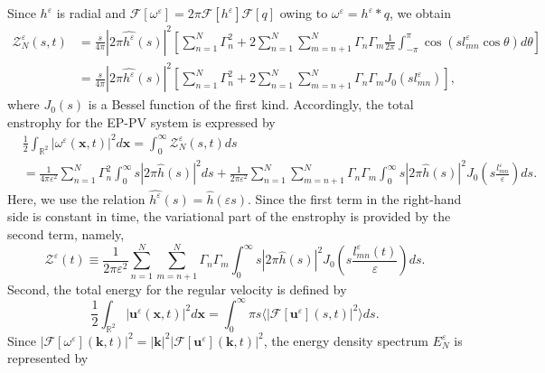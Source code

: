 \documentclass{article}
\theoremstyle{definition}
\begin{document}
Since $h^\varepsilon$ is radial and $\mathscr{F}[\omega^\varepsilon] = 2 \pi \mathscr{F}[h^\varepsilon] \mathscr{F}[q]$ owing to $\omega^\varepsilon = h^\varepsilon \ast q$, we obtain
\begin{align*}
\mathscr{Z}_N^\varepsilon (s,t) &= \frac{s}{4 \pi} \left\vert 2 \pi \widehat{h^\varepsilon}(s) \right\vert^2 \left[ \sum_{n=1}^N \Gamma_n^2 + 2 \sum_{n=1}^N \sum_{m=n+1}^N \Gamma_n \Gamma_m \frac{1}{2\pi}\int_{-\pi}^\pi \cos \left( s l_{mn}^\varepsilon \cos \theta \right) d\theta \right]  \\
& = \frac{s}{4 \pi} \left\vert 2 \pi \widehat{h^\varepsilon}(s) \right\vert^2 \left[ \sum_{n=1}^N \Gamma_n^2 + 2 \sum_{n=1}^N \sum_{m=n+1}^N \Gamma_n \Gamma_m J_0 \left( s l_{mn}^\varepsilon \right) \right],
\end{align*}
where $J_0(s)$ is a Bessel function of the first kind. Accordingly, the total enstrophy for the EP-PV system is expressed by
\begin{align*}
&\frac{1}{2}\int_{\mathbb{R}^2} \left\vert \omega^\varepsilon({\bm x}, t) \right\vert^2 d{\bm x} = \int_0^\infty  \mathscr{Z}_N^\varepsilon (s,t)  ds  \\
&= \frac{1}{4 \pi \varepsilon^2} \sum_{n=1}^N \Gamma_n^2 \int_0^\infty s \left\vert 2\pi\widehat{h}(s) \right\vert^2 ds  +  \frac{1}{2\pi \varepsilon^2} \sum_{n=1}^N \sum_{m=n+1}^N \Gamma_n \Gamma_m \int_0^\infty s \left\vert 2\pi\widehat{h}(s) \right\vert^2  J_0 \left( s \frac{l_{mn}^\varepsilon}{\varepsilon} \right) ds.
\end{align*} 
Here, we use the relation $\widehat{h^\varepsilon}(s) = \widehat{h}(\varepsilon s)$. Since the first term in the right-hand side is constant in time,  the variational part of the enstrophy  is provided 
by the second term, namely, 
\begin{equation}
\mathscr{Z}^\varepsilon(t) \equiv \frac{1}{2\pi \varepsilon^2} \sum_{n=1}^N \sum_{m=n+1}^N \Gamma_n \Gamma_m \int_0^\infty s \left\vert 2\pi\widehat{h}(s) \right\vert^2  J_0 \left( s \frac{l_{mn}^\varepsilon(t)}{\varepsilon} \right) ds. \label{v-enstrophy}
\end{equation}
Second,  the total energy for the regular velocity is defined by
\begin{equation*}
\frac{1}{2}\int_{\mathbb{R}^2} \left\vert {\bm u}^\varepsilon({\bm x}, t) \right\vert^2 d{\bm x} = \int_0^\infty  \pi s \langle \left\vert \mathscr{F}[{\bm u}^\varepsilon](s,t) \right\vert^2 \rangle ds.
\end{equation*}
Since $\left\vert \mathscr{F}[\omega^\varepsilon]({\bm k}, t) \right\vert^2 = \vert{\bm k}\vert^2 \left\vert \mathscr{F}[{\bm u}^\varepsilon]({\bm k}, t) \right\vert^2$,  the energy density spectrum $E_N^\varepsilon$ is represented by
\end{document}
